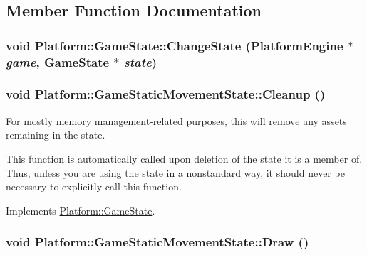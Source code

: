 \subsection{Member Function Documentation}
\hypertarget{class_platform_1_1_game_state_602091629b4bca2073f12bfa6c61e6d0}{
\subsubsection[{ChangeState}]{\setlength{\rightskip}{0pt plus 5cm}void Platform::GameState::ChangeState ({\bf PlatformEngine} $\ast$ {\em game}, \/  {\bf GameState} $\ast$ {\em state})}}
\label{d4/d4f/class_platform_1_1_game_state_602091629b4bca2073f12bfa6c61e6d0}


\hypertarget{class_platform_1_1_game_static_movement_state_4ae9849145c65e3a7276c545c5bbda18}{
\subsubsection[{Cleanup}]{\setlength{\rightskip}{0pt plus 5cm}void Platform::GameStaticMovementState::Cleanup ()}}
\label{db/d55/class_platform_1_1_game_static_movement_state_4ae9849145c65e3a7276c545c5bbda18}


For mostly memory management-related purposes, this will remove any assets remaining in the state.

This function is automatically called upon deletion of the state it is a member of. Thus, unless you are using the state in a nonstandard way, it should never be necessary to explicitly call this function. 

Implements \hyperlink{class_platform_1_1_game_state_e85d9b80e26a0a4708423e370d0a4b8a}{Platform::GameState}.\hypertarget{class_platform_1_1_game_static_movement_state_8063dc783ff51732472010f23bed78e7}{
\subsubsection[{Draw}]{\setlength{\rightskip}{0pt plus 5cm}void Platform::GameStaticMovementState::Draw ()}}
\label{db/d55/class_platform_1_1_game_static_movement_state_8063dc783ff51732472010f23bed78e7}


